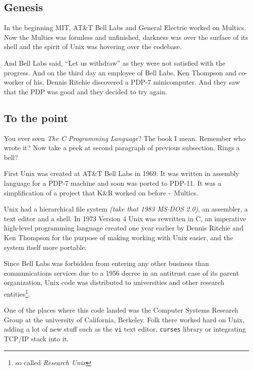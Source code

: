 \documentclass[../ops.tex]{subfiles}
\begin{document}
        \subsection{Genesis}
        In the beginning MIT, AT\&T Bell Labs and General Electric worked on
        Multics. Now the Multics was formless and unfinished, darkness was over
        the surface of its shell and the spirit of Unix was hovering over the
        codebase.

        And Bell Labs said, ``Let us withdraw'' as they were not satisfied with
        the progress. And on the third day an employee of Bell Labs, Ken
        Thompson and co-worker of his, Dennis Ritchie discovered a PDP-7
        minicomputer. And they saw that the PDP was good and they decided to
        try again.
        
        \subsection{To the point}
        You ever seen \emph{The C Programming Language}? The book I mean.
        Remember who wrote it? Now take a peek at second paragraph of previous
        subsection. Rings a bell?

        First Unix was created at AT\&T Bell Labs in 1969. It was written in
        assembly language for a PDP-7 machine and soon was ported to PDP-11.
        It was a simplification of a project that K\&R worked on before
        -~Multics.

        Unix had a hierarchical file system \emph{(take that 1983 MS-DOS 2.0)},
        an assembler, a text editor and a shell. In 1973 Version 4 Unix was
        rewritten in C, an imperative high-level programming language created
        one year earlier by Dennis Ritchie and Ken Thompson for the purpose of
        making working with Unix easier, and the system itself more portable.

        Since Bell Labs was forbidden from entering any other business than
        communications services due to a 1956 decree in an antitrust case of its
        parent organization, Unix code was distributed to universities and other
        research entities\footnote{so called \emph{Research Unix}}.

        One of the places where this code landed was the Computer Systems
        Research Group at the university of California, Berkeley. Folk there
        worked hard on Unix, adding a lot of new stuff such as the {\tt vi} text
        editor, {\tt curses} library or integrating TCP/IP stack into it.
\end{document}
